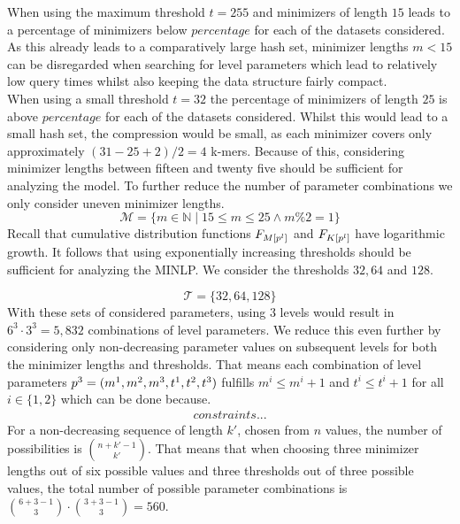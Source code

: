 \documentclass[a4paper,titlepage,onecolumn,oneside,12pt,nenglish,titlepage=firstiscover]{scrbook}
\theoremstyle{plain} %
\theoremstyle{definition} %
\theoremstyle{remark} %
\theoremstyle{plain}
\newcommand{\NN}{\mathbb{N}} %
\newcommand{\minimizerLength}{m}
\newcommand{\threshold}{t}
\newcommand{\level}{l}
\newcommand{\possibleMinimizerLengths}{\mathcal{M}}
\newcommand{\possibleThresholds}{\mathcal{T}}
\begin{document}
When using the maximum threshold $\threshold=255$ and minimizers of length $15$ leads to a percentage of \infrequent  minimizers below $percentage$ for each of the datasets considered. As this already leads to a comparatively large hash set, minimizer lengths $\minimizerLength < 15$ can be disregarded when searching for level parameters which lead to relatively low query times whilst also keeping the data structure fairly compact.
\\
When using a small threshold $\threshold=32$ the percentage of \infrequent minimizers of length $25$ is above $percentage$ for each of the datasets considered. 
Whilst this would lead to a small hash set, the compression would be small, as each minimizer covers only approximately $(31-25+2)/2 = 4$ k-mers. Because of this, considering minimizer lengths between fifteen and twenty five should be sufficient for analyzing the model. To further reduce the number of parameter combinations we only consider uneven minimizer lengths.
\begin{equation}
	\possibleMinimizerLengths = \{\minimizerLength \in \NN \mid 15 \leq \minimizerLength \leq 25 \wedge \minimizerLength \% 2 = 1\}
\end{equation}
Recall that cumulative distribution functions $\CDF{\compactZV{M}{\levelParameters{\level}}}$ and $\CDF{\compactZV{K}{\levelParameters{\level}}}$ have logarithmic growth. It follows that using exponentially increasing thresholds should be sufficient for analyzing the MINLP.
We consider the thresholds $32,64$ and $128$.

\begin{equation}
	\possibleThresholds = \{32,64,128\}
\end{equation}
With these sets of considered parameters, using $3$ levels would result in $6^3 \cdot 3^3 = 5,832$ combinations of level parameters. We reduce this even further by considering only non-decreasing parameter values on subsequent levels for both the minimizer lengths and thresholds. That means each combination of level parameters $\levelParameters{3} = (\minimizerLength^1, \minimizerLength^2, \minimizerLength^3, \threshold^1, \threshold^2, \threshold^3)$ fulfills $\minimizerLength^i \leq \minimizerLength^i+1$ and $\threshold^i \leq \threshold^i+1$ for all $i \in \{1,2\}$ which can be done because. 
\begin{align}
	constraints...
\end{align}
For a non-decreasing sequence of length $k'$, chosen from $n$ values, the number of possibilities is $\binom{n+k'-1}{k'}$. That means that when choosing three minimizer lengths out of six possible values and three thresholds out of three possible values, the total number of possible parameter combinations is $\binom{6+3-1}{3} \cdot \binom{3+3-1}{3} = 560$.
\end{document}
